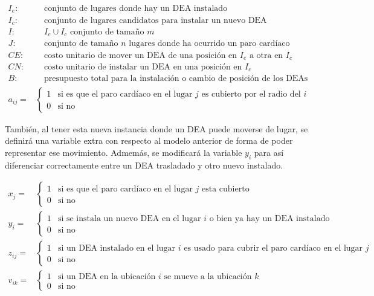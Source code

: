 \documentclass[letter, 10pt]{article}
\begin{document}
\begin{align*}
    I_{e}: & \quad \text{conjunto de lugares donde hay un DEA instalado}\\
    I_{c}: & \quad \text{conjunto de lugares candidatos para instalar un nuevo DEA}\\
    I: & \quad I_{e} \cup I_{c} \text{ conjunto de tama\~no $m$}\\
    J: & \quad \text{conjunto de tama\~no $n$ lugares donde ha ocurrido un paro card\'iaco}\\
    CE: & \quad \text{costo unitario de mover un DEA de una posici\'on en } I_{e} \text{ a otra en } I_{c}\\
    CN: & \quad \text{costo unitario de instalar un DEA en una posici\'on en } I_{c}\\
    B: & \quad \text{presupuesto total para la instalaci\'on o cambio de posici\'on de los DEAs}\\
    a_{ij} = & \begin{cases}
    1 & \text{si es que el paro card\'iaco en el lugar $j$ es cubierto por el radio del $i$}\\
    0 & \text{si no}
    \end{cases}
\end{align*}

Tambi\'en, al tener esta nueva instancia donde un DEA puede moverse de lugar, se definir\'a una variable extra con respecto al modelo anterior de forma de poder representar ese movimiento. Admem\'as, se modificar\'a la variable $y_{i}$ para as\'i diferenciar correctamente entre un DEA trasladado y otro nuevo instalado.

\begin{align*}
    x_{j} = & \begin{cases}
    1 & \text{si es que el paro card\'iaco en el lugar $j$ esta cubierto}\\
    0 & \text{si no}
    \end{cases}\\
    y_{i} = & \begin{cases}
    1 & \text{si se instala un nuevo DEA en el lugar $i$ o bien ya hay un DEA instalado}\\
    0 & \text{si no}
    \end{cases}\\
    z_{ij} = & \begin{cases}
    1 & \text{si un DEA instalado en el lugar $i$ es usado para cubrir el paro card\'iaco en el lugar $j$}\\
    0 & \text{si no}
    \end{cases}\\
    v_{ik} = & \begin{cases}
    1 & \text{si un DEA en la ubicaci\'on $i$ se mueve a la ubicaci\'on $k$}\\
    0 & \text{si no}
    \end{cases}
\end{align*}
\end{document}

